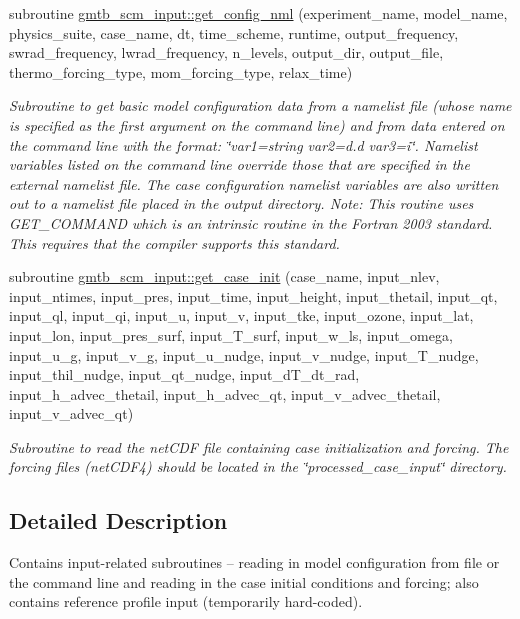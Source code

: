 \begin{DoxyCompactItemize}
\item 
subroutine \hyperlink{group__input_ga53e9e5313d4dfa2d2f917d212f92f636}{gmtb\+\_\+scm\+\_\+input\+::get\+\_\+config\+\_\+nml} (experiment\+\_\+name, model\+\_\+name, physics\+\_\+suite, case\+\_\+name, dt, time\+\_\+scheme, runtime, output\+\_\+frequency,   swrad\+\_\+frequency, lwrad\+\_\+frequency, n\+\_\+levels, output\+\_\+dir, output\+\_\+file, thermo\+\_\+forcing\+\_\+type, mom\+\_\+forcing\+\_\+type, relax\+\_\+time)
\begin{DoxyCompactList}\small\item\em Subroutine to get basic model configuration data from a namelist file (whose name is specified as the first argument on the command line) and from data entered on the command line with the format\+: \char`\"{}var1=\textquotesingle{}string\textquotesingle{} var2=d.\+d var3=i\char`\"{}. Namelist variables listed on the command line override those that are specified in the external namelist file. The case configuration namelist variables are also written out to a namelist file placed in the output directory. Note\+: This routine uses G\+E\+T\+\_\+\+C\+O\+M\+M\+A\+ND which is an intrinsic routine in the Fortran 2003 standard. This requires that the compiler supports this standard. \end{DoxyCompactList}\end{DoxyCompactItemize}

{\bf }\par
\begin{DoxyCompactItemize}
\item 
subroutine \hyperlink{group__input_ga0941c411598781019aef6c3a047a040c}{gmtb\+\_\+scm\+\_\+input\+::get\+\_\+case\+\_\+init} (case\+\_\+name, input\+\_\+nlev, input\+\_\+ntimes, input\+\_\+pres, input\+\_\+time, input\+\_\+height, input\+\_\+thetail,   input\+\_\+qt, input\+\_\+ql, input\+\_\+qi, input\+\_\+u, input\+\_\+v, input\+\_\+tke, input\+\_\+ozone, input\+\_\+lat, input\+\_\+lon, input\+\_\+pres\+\_\+surf, input\+\_\+\+T\+\_\+surf,   input\+\_\+w\+\_\+ls, input\+\_\+omega, input\+\_\+u\+\_\+g, input\+\_\+v\+\_\+g, input\+\_\+u\+\_\+nudge, input\+\_\+v\+\_\+nudge, input\+\_\+\+T\+\_\+nudge, input\+\_\+thil\+\_\+nudge, input\+\_\+qt\+\_\+nudge,   input\+\_\+d\+T\+\_\+dt\+\_\+rad, input\+\_\+h\+\_\+advec\+\_\+thetail, input\+\_\+h\+\_\+advec\+\_\+qt, input\+\_\+v\+\_\+advec\+\_\+thetail, input\+\_\+v\+\_\+advec\+\_\+qt)
\begin{DoxyCompactList}\small\item\em Subroutine to read the net\+C\+DF file containing case initialization and forcing. The forcing files (net\+C\+D\+F4) should be located in the \char`\"{}processed\+\_\+case\+\_\+input\char`\"{} directory. \end{DoxyCompactList}\end{DoxyCompactItemize}



\subsection{Detailed Description}
Contains input-\/related subroutines -- reading in model configuration from file or the command line and reading in the case initial conditions and forcing; also contains reference profile input (temporarily hard-\/coded). 

